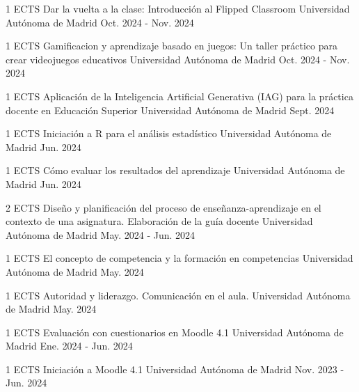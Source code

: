 \begin{cventries}
	
	\cventry
	{1 ECTS} %
	{Dar la vuelta a la clase: Introducción al Flipped Classroom} %
	{Universidad Autónoma de Madrid} %
	{Oct. 2024 - Nov. 2024} %
	{}
	
	\cventry
	{1 ECTS} %
	{Gamificacion y aprendizaje basado en juegos: Un taller práctico para crear videojuegos educativos} %
	{Universidad Autónoma de Madrid} %
	{Oct. 2024 - Nov. 2024} %
	{}
	
	\cventry
	{1 ECTS} %
	{Aplicación de la Inteligencia Artificial Generativa (IAG) para la práctica docente en Educación Superior} %
	{Universidad Autónoma de Madrid} %
	{Sept. 2024} %
	{}
	
	\cventry
	{1 ECTS} %
	{Iniciación a R para el análisis estadístico
	} %
	{Universidad Autónoma de Madrid} %
	{Jun. 2024} %
	{}
	
	\cventry
	{1 ECTS} %
	{Cómo evaluar los resultados del aprendizaje} %
	{Universidad Autónoma de Madrid} %
	{Jun. 2024} %
	{}
	
	\cventry
	{2 ECTS} %
	{Diseño y planificación del proceso de enseñanza-aprendizaje en el contexto de una asignatura. Elaboración de la guía docente} %
	{Universidad Autónoma de Madrid} %
	{May. 2024 - Jun. 2024} %
	{}
	
	\cventry
	{1 ECTS} %
	{El concepto de competencia y la formación en competencias} %
	{Universidad Autónoma de Madrid} %
	{May. 2024} %
	{}
	
	\cventry
	{1 ECTS} %
	{Autoridad y liderazgo. Comunicación en el aula.} %
	{Universidad Autónoma de Madrid} %
	{May. 2024} %
	{}
	
	\cventry
	{1 ECTS} %
	{Evaluación con cuestionarios en Moodle 4.1} %
	{Universidad Autónoma de Madrid} %
	{Ene. 2024 - Jun. 2024} %
	{}
	
	\cventry
	{1 ECTS} %
	{Iniciación a Moodle 4.1} %
	{Universidad Autónoma de Madrid} %
	{Nov. 2023 - Jun. 2024} %
	{}
	

\end{cventries}
